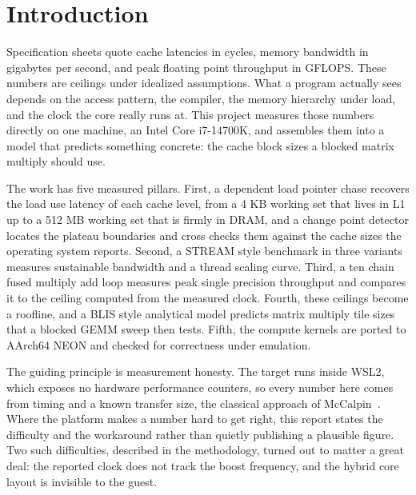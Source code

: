 \chapter{Introduction}

Specification sheets quote cache latencies in cycles, memory bandwidth in
gigabytes per second, and peak floating point throughput in GFLOPS. These
numbers are ceilings under idealized assumptions. What a program actually sees
depends on the access pattern, the compiler, the memory hierarchy under load,
and the clock the core really runs at. This project measures those numbers
directly on one machine, an Intel Core i7-14700K, and assembles them into a
model that predicts something concrete: the cache block sizes a blocked matrix
multiply should use.

The work has five measured pillars. First, a dependent load pointer chase
recovers the load use latency of each cache level, from a 4 KB working set that
lives in L1 up to a 512 MB working set that is firmly in DRAM, and a change
point detector locates the plateau boundaries and cross checks them against the
cache sizes the operating system reports. Second, a STREAM style benchmark in
three variants measures sustainable bandwidth and a thread scaling curve.
Third, a ten chain fused multiply add loop measures peak single precision
throughput and compares it to the ceiling computed from the measured clock.
Fourth, these ceilings become a roofline, and a BLIS style analytical model
predicts matrix multiply tile sizes that a blocked GEMM sweep then tests.
Fifth, the compute kernels are ported to AArch64 NEON and checked for
correctness under emulation.

The guiding principle is measurement honesty. The target runs inside WSL2,
which exposes no hardware performance counters, so every number here comes from
timing and a known transfer size, the classical approach of
McCalpin~\cite{mccalpin1995}. Where the platform makes a number hard to get
right, this report states the difficulty and the workaround rather than quietly
publishing a plausible figure. Two such difficulties, described in the
methodology, turned out to matter a great deal: the reported clock does not
track the boost frequency, and the hybrid core layout is invisible to the
guest.
